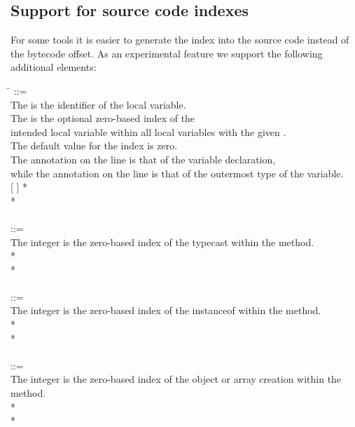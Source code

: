 \documentclass{article}
\begin{document}
\subsection{Support for source code indexes\label{source-code-index}}

For some tools it is easier to generate the index into the source code
instead of the bytecode offset.
As an experimental feature we support the following additional
elements:


\begin{tabbing}
\qquad \= \kill
{} ::= \\
\qquad    \bnfcmt The  is the identifier of the local variable.\\
\qquad    \bnfcmt The  is the optional zero-based index of the\\
\qquad    \bnfcmt intended local variable within all local variables with the given
.\\
\qquad    \bnfcmt The default value for the index is zero.\\
\qquad    \bnfcmt The annotation on the  line is that of the variable declaration, \\
\qquad    \bnfcmt while the annotation on the  line is that of the outermost type of the variable. \\
\qquad    {}  [\bnflit{*} ] \bnflit{:} * \lineend \\
\qquad    {}* \\
\\
 ::= \\
\qquad    \bnfcmt The integer is the zero-based index of the
typecast within the method. \\
\qquad    {} \bnflit{*}  \bnflit{:} * \lineend \\
\qquad    {}* \\
\\
 ::= \\
\qquad    \bnfcmt The integer is the zero-based index of the
instanceof within the method. \\
\qquad    {} \bnflit{*}  \bnflit{:} * \lineend \\
\qquad    {}* \\
\\
 ::= \\
\qquad    \bnfcmt The integer is the zero-based index of the
object or array creation within the method. \\
\qquad    {} \bnflit{*}  \bnflit{:} * \lineend  \\
\qquad    {}*
\end{tabbing}
\end{document}
